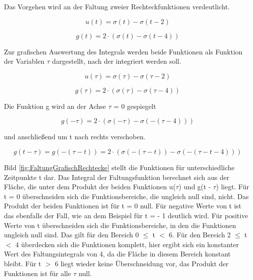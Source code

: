 \noindent Das Vorgehen wird an der Faltung zweier Rechteckfunktionen verdeutlicht. 

\begin{equation}\label{eq:threehundredfiftynine}
u\left(t\right)=\sigma \left(t\right)-\sigma \left(t-2\right)
\end{equation}

\begin{equation}\label{eq:threehundredsixty}
g\left(t\right)=2\cdot \left(\sigma \left(t\right)-\sigma \left(t-4\right)\right)
\end{equation}

\noindent Zur grafischen Auswertung des Integrals werden beide Funktionen als Funktion der Variablen $\tau$ dargestellt, nach der integriert werden soll. 

\begin{equation}\label{eq:threehundredsixtyone}
u\left(\tau \right)=\sigma \left(\tau \right)-\sigma \left(\tau -2\right)
\end{equation}

\begin{equation}\label{eq:threehundredsixtytwo}
g\left(\tau \right)=2\cdot \left(\sigma \left(\tau \right)-\sigma \left(\tau -4\right)\right)
\end{equation}

\noindent Die Funktion g wird an der Achse $\tau$ = 0 gespiegelt 

\begin{equation}\label{eq:threehundredsixtythree}
g\left(-\tau \right)=2\cdot \left(\sigma \left(-\tau \right)-\sigma \left(-\left(\tau -4\right)\right)\right)
\end{equation}

\noindent und anschlie{\ss}end um t nach rechts verschoben. 

\begin{equation}\label{eq:threehundredsixtyfour}
g\left(t-\tau \right)=g\left(-\left(\tau -t\right)\right)=2\cdot \left(\sigma \left(-\left(\tau -t\right)\right)-\sigma \left(-\left(\tau -t-4\right)\right)\right)
\end{equation}

\noindent Bild \ref{fig:FaltungGrafischRechtecke} stellt die Funktionen f\"{u}r unterschiedliche Zeitpunkte t dar. Das Integral der Faltungsfunktion berechnet sich aus der Fl\"{a}che, die unter dem Produkt der beiden Funktionen u($\tau$) und g(t - $\tau$) liegt. F\"{u}r t = 0 \"{u}berschneiden sich die Funktionsbereiche, die ungleich null sind, nicht. Das Produkt der beiden Funktionen ist f\"{u}r t = 0 null. F\"{u}r negative Werte von t ist das ebenfalls der Fall, wie an dem Beispiel f\"{u}r t = - 1 deutlich wird. F\"{u}r positive Werte von t \"{u}berschneiden sich die Funktionsbereiche, in den die Funktionen ungleich null sind. Das gilt f\"{u}r den Bereich 0 $\leq$ t $\mathrm{<}$ 6. F\"{u}r den Bereich 2 $\leq$ t $\mathrm{<}$ 4 \"{u}berdecken sich die Funktionen komplett, hier ergibt sich ein konstanter Wert des Faltungsintegrals von 4, da die Fl\"{a}che in diesem Bereich konstant bleibt. F\"{u}r t $\mathrm{>}$ 6 liegt wieder keine \"{U}berschneidung vor, das Produkt der Funktionen ist f\"{u}r alle $\tau$ null.

